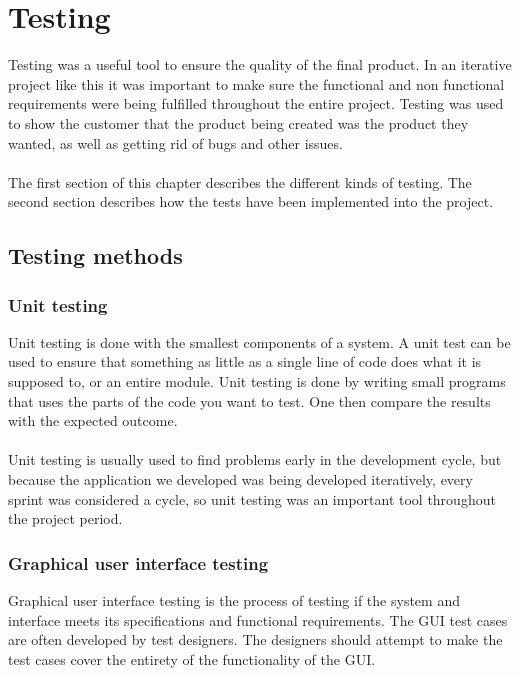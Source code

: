 \chapter{Testing}
Testing was a useful tool to ensure the quality of the final product. In an iterative project like this it was important to make sure the functional and non functional requirements were being fulfilled throughout the entire project. Testing was used to show the customer that the product being created was the product they wanted, as well as getting rid of bugs and other issues.\\
\\
The first section of this chapter describes the different kinds of testing. The second section describes how the tests have been implemented into the project.

\section{Testing methods}

\subsection{Unit testing}
Unit testing is done with the smallest components of a system. A unit test can be used to ensure that something as little as a single line of code does what it is supposed to, or an entire module. Unit testing is done by writing small programs that uses the parts of the code you want to test. One then compare the results with the expected outcome. \cite{Beginnersguide} \cite{AgileAlliance}\\
\\
Unit testing is usually used to find problems early in the development cycle, but because the application we developed was being developed iteratively, every sprint was considered a cycle, so unit testing was an important tool throughout the project period.

\subsection{Graphical user interface testing}
Graphical user interface testing is the process of testing if the system and interface meets its specifications and functional requirements. The GUI test cases are often developed by test designers. The designers should attempt to make the test cases cover the entirety of the functionality of the GUI.\cite{GUItestMeth}

